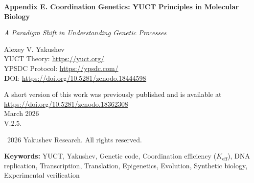 \documentclass[12pt]{article}
\begin{document}
	
	\begin{titlepage}
		\begin{center}
			\vspace*{0cm}
			
			\Huge\textbf{Appendix E. Coordination Genetics: YUCT Principles in Molecular Biology}
			
			\vspace{1cm}
			
			\small\textit{A Paradigm Shift in Understanding Genetic Processes}
			
			\vspace{1cm}
			\Large
			Alexey V. Yakushev\\
			
	YUCT Theory: \url{https://yuct.org/}\\
YPSDC Protocol: \url{https://ypsdc.com/}\\


\vspace{2cm}
\textbf DOI: \url{https://doi.org/10.5281/zenodo.18444598}\\

\vspace{1cm}

\vspace{0cm}
\large 
A short version of this work was previously published and is available at\\ \url{https://doi.org/10.5281/zenodo.18362308}\\
\vspace{1cm}
March 2026 \\ \large V.2.5.
			
			\vspace{4cm}
			\textcopyright~2026 Yakushev Research. All rights reserved.
			
			\newpage	
			\begin{abstract}
				\noindent
				This work presents a fundamental rethinking of genetic processes through the lens of Yakushev's coordination principles. We demonstrate that the genetic code, DNA replication, gene expression, and evolution represent coordination processes with measurable efficiency $K_{\text{eff}}$. New mathematical models are introduced, predicting previously unexplained phenomena and opening pathways to programmable evolution. The theory provides testable predictions across multiple experimental domains, from simple laboratory tests to complex genetic engineering projects.
			\end{abstract}
			
			\vspace{0cm}
			
			\noindent
			\textbf{Keywords:} YUCT, Yakushev, Genetic code, Coordination efficiency ($K_{\text{eff}}$), DNA replication, Transcription, Translation, Epigenetics, Evolution, Synthetic biology,  Experimental verification
			
			\vspace{0.5cm}
			
		\end{center}
	\end{titlepage}
	
\end{document}
